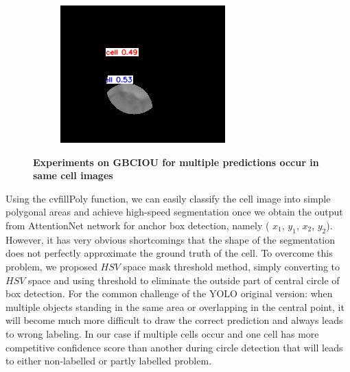 \begin{figure}[h]
\begin{center}
\begin{subfigure}[b]{0.25\textwidth}
		\end{subfigure}
		\begin{subfigure}[b]{0.25\textwidth}
		    \centering
			\includegraphics[width=\textwidth]{thesis-template-master/images/gbciou12.png}
			\caption{}
			\label{fig:cellnet}
		\end{subfigure}
	\end{center}
	\caption{\textbf{Experiments on GBCIOU for multiple predictions occur in same cell images}}
\end{figure}

Using the cvfillPoly function, we can easily classify the cell image into simple polygonal areas and achieve high-speed segmentation once we obtain the output from AttentionNet network for anchor box detection, namely ( $x_{1}$, $y_{1}$, $x_{2}$, $y_{2}$). However, it has very obvious shortcomings that the shape of the segmentation does not perfectly approximate the ground truth of the cell. To overcome this problem, we proposed $HSV$ space mask threshold method, simply converting to $HSV$ space and using threshold to eliminate the outside part of central circle of box detection.  For the common challenge of the YOLO original version: when multiple objects standing in the same area or overlapping in the central point, it will become much more difficult to draw the correct prediction and always leads to wrong labeling. In our case if multiple cells occur and one cell has more competitive confidence score than another during circle detection that will leads to either non-labelled or partly labelled problem.

